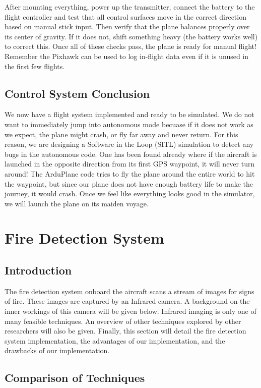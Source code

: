 \documentclass[12pt,journal,compsoc]{IEEEtran}
\begin{document}
After mounting everything, power up the transmitter, connect the battery to the flight controller and test that all control surfaces move in the correct direction based on manual stick input. Then verify that the plane balances properly over its center of gravity. If it does not, shift something heavy (the battery works well) to correct this. Once all of these checks pass, the plane is ready for manual flight! Remember the Pixhawk can be used to log in-flight data even if it is unused in the first few flights.

\subsection{Control System Conclusion}
We now have a flight system implemented and ready to be simulated. We do not want to immediately jump into autonomous mode becuase if it does not work as we expect, the plane might crash, or fly far away and never return. For this reason, we are designing a Software in the Loop (SITL) simulation to detect any bugs in the autonomous code. One has been found already where if the aircraft is launched in the opposite direction from its first GPS waypoint, it will never turn around! The ArduPlane code tries to fly the plane around the entire world to hit the waypoint, but since our plane does not have enough battery life to make the journey, it would crash. Once we feel like everything looks good in the simulator, we will launch the plane on its maiden voyage.

\section{Fire Detection System}
\subsection{Introduction}
The fire detection system onboard the aircraft scans a stream of images for signs of fire. These images are captured by an Infrared camera. A background on the inner workings of this camera will be given below. Infrared imaging is only one of many feasible techniques. An overview of other techniques explored by other researchers will also be given. Finally, this section will detail the fire detection system implementation, the advantages of our implementation, and the drawbacks of our implementation. 

\subsection{Comparison of Techniques} \label{fire_comparison_section}
\end{document}
